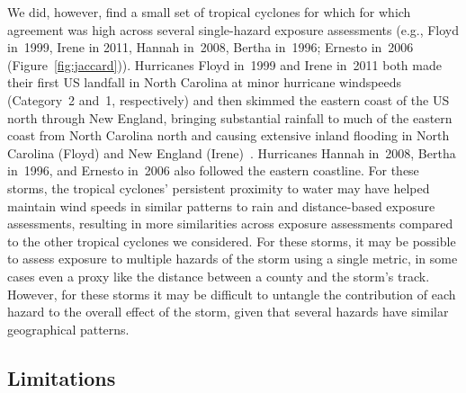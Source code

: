 We did, however, find a small set of tropical cyclones for which for
which agreement was high across several single-hazard exposure assessments
(e.g., Floyd in~1999, Irene in 2011, Hannah in~2008, Bertha in~1996; Ernesto
in~2006 (Figure~\ref{fig:jaccard})).  Hurricanes Floyd in~1999 and
Irene in~2011 both made their first \ac{US} landfall in North Carolina at minor
hurricane windspeeds (Category~2 and~1, respectively) and then skimmed the
eastern coast of the \ac{US} north through New England, bringing substantial
rainfall to much of the eastern coast from North Carolina north and causing
extensive inland flooding in North Carolina (Floyd) and New England
(Irene)~\parencite{avila2013atlantic, lawrence2000atlantic}.  Hurricanes Hannah
in~2008, Bertha in~1996, and Ernesto in~2006 also followed the eastern
coastline. For these storms, the tropical cyclones' persistent proximity
to water may have helped maintain wind speeds in similar patterns to rain and
distance-based exposure assessments, resulting in more similarities across
exposure assessments compared to the other tropical cyclones we considered.
For these storms, it may be possible to assess exposure to multiple hazards of
the storm using a single metric, in some cases even a proxy like the distance
between a county and the storm's track.  However, for these storms it may be
difficult to untangle the contribution of each hazard to the overall
effect of the storm, given that several hazards have similar geographical
patterns. 

\subsection*{Limitations}

